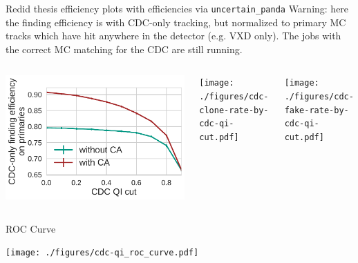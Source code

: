 \documentclass[presentation]{etp-beamer-fancy}
\begin{document}
\begin{frame}[label={sec:org1d0a6ff},fragile]{Redid thesis efficiency plots with efficiencies via \texttt{uncertain\_panda}}
 \alert{Warning}: here the finding efficiency is with CDC-only tracking, but normalized to primary MC
 tracks which have hit anywhere in the detector (e.g. VXD only). The jobs with the correct MC
 matching for the CDC are still running.
\begin{columns}
\begin{column}{.33\columnwidth}
\begin{center}
\includegraphics[width=.9\linewidth]{./figures/cdc-finding-efficiency-by-cdc-qi-cut.pdf}
\end{center}
\end{column}

\begin{column}{.33\columnwidth}
\begin{center}
\texttt{[image: ./figures/cdc-clone-rate-by-cdc-qi-cut.pdf]}
\end{center}
\end{column}

\begin{column}{.33\columnwidth}
\begin{center}
\texttt{[image: ./figures/cdc-fake-rate-by-cdc-qi-cut.pdf]}
\end{center}
\end{column}
\end{columns}
\end{frame}


\begin{frame}[label={sec:org86d8f59}]{ROC Curve}
\begin{center}
\texttt{[image: ./figures/cdc-qi\_roc\_curve.pdf]}
\end{center}
\end{frame}
\end{document}
